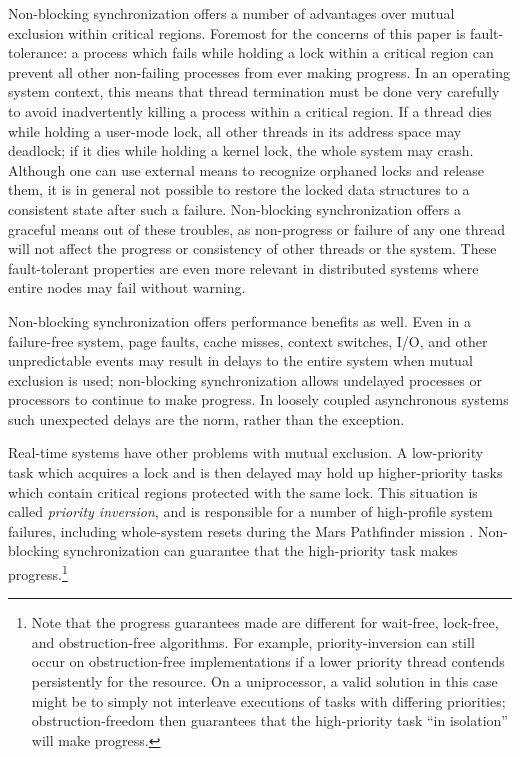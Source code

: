 \documentclass[preprint]{rdbacmconf}
\begin{document}
Non-blocking synchronization offers a number of advantages over mutual
exclusion within critical regions.  Foremost for the concerns of this paper is
fault-tolerance:  a process which fails while holding a lock within a
critical region can prevent all other non-failing processes from
ever making progress.  In an operating system context, this means that
thread termination must be done very carefully to avoid inadvertently
killing a process within a critical region.  If a thread dies while
holding a user-mode lock, all other threads in its address space may
deadlock; if it dies while holding a kernel lock, the whole system may
crash.  Although one can use external means to recognize orphaned
locks and release them, it is in general not possible to restore the
locked data structures to a consistent state after such a failure.
Non-blocking synchronization offers a graceful means out of
these troubles, as non-progress or failure of any one thread will not
affect the progress or consistency of other threads or the system.
These fault-tolerant properties are even more relevant in
distributed systems where entire nodes may fail without warning.

Non-blocking synchronization offers performance benefits as well.
Even in a failure-free system, page faults, cache misses, context
switches, I/O, and other unpredictable events may result in delays to the
entire system when mutual exclusion is used; non-blocking
synchronization allows undelayed processes or processors to continue
to make progress.  In loosely coupled asynchronous systems such
unexpected delays are the norm, rather than the exception.

Real-time systems have other problems with mutual exclusion.
A low-priority task which 
acquires a lock and is then delayed may hold up higher-priority tasks
which contain critical regions protected with the same lock.
This situation is called
\emph{priority inversion}, and is responsible for a number of
high-profile system failures, including whole-system resets during the Mars
Pathfinder mission \cite{Jones97}.  Non-blocking
synchronization can guarantee that the high-priority task makes
progress.\footnote{Note that the progress guarantees made are
  different for wait-free, lock-free, and obstruction-free
  algorithms.  For example, priority-inversion can still occur on
  obstruction-free implementations if a lower priority thread contends
  persistently for the resource.  On a uniprocessor, a valid solution
  in this case might be to simply not interleave executions of tasks
  with differing priorities; obstruction-freedom then guarantees that
  the high-priority task ``in isolation'' will make progress.}
\end{document}
